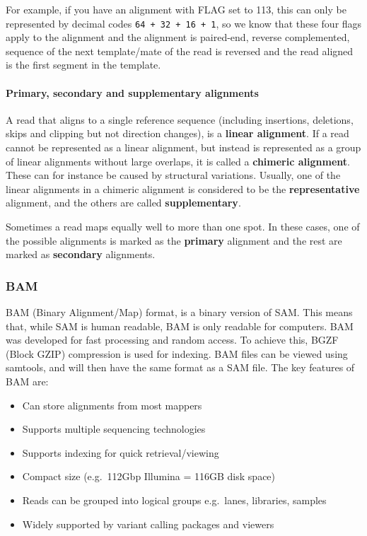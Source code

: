 \documentclass[11pt]{article}
\providecommand{\tightlist}{%
      \setlength{\itemsep}{0pt}\setlength{\parskip}{0pt}}
\begin{document}
For example, if you have an alignment with FLAG set to 113, this can
only be represented by decimal codes \texttt{64\ +\ 32\ +\ 16\ +\ 1}, so
we know that these four flags apply to the alignment and the alignment
is paired-end, reverse complemented, sequence of the next template/mate
of the read is reversed and the read aligned is the first segment in the
template.

\hypertarget{primary-secondary-and-supplementary-alignments}{%
\paragraph{Primary, secondary and supplementary
alignments}\label{primary-secondary-and-supplementary-alignments}}

A read that aligns to a single reference sequence (including insertions,
deletions, skips and clipping but not direction changes), is a
\textbf{linear alignment}. If a read cannot be represented as a linear
alignment, but instead is represented as a group of linear alignments
without large overlaps, it is called a \textbf{chimeric alignment}.
These can for instance be caused by structural variations. Usually, one
of the linear alignments in a chimeric alignment is considered to be the
\textbf{representative} alignment, and the others are called
\textbf{supplementary}.

Sometimes a read maps equally well to more than one spot. In these
cases, one of the possible alignments is marked as the \textbf{primary}
alignment and the rest are marked as \textbf{secondary} alignments.

\hypertarget{bam}{%
\subsubsection{BAM}\label{bam}}

BAM (Binary Alignment/Map) format, is a binary version of SAM. This
means that, while SAM is human readable, BAM is only readable for
computers. BAM was developed for fast processing and random access. To
achieve this, BGZF (Block GZIP) compression is used for indexing. BAM
files can be viewed using samtools, and will then have the same format
as a SAM file. The key features of BAM are:



\newpage



\begin{itemize}
\tightlist
\item
  Can store alignments from most mappers
\item
  Supports multiple sequencing technologies
\item
  Supports indexing for quick retrieval/viewing
\item
  Compact size (e.g.~112Gbp Illumina = 116GB disk space)
\item
  Reads can be grouped into logical groups e.g.~lanes, libraries,
  samples
\item
  Widely supported by variant calling packages and viewers
\end{itemize}
\end{document}
